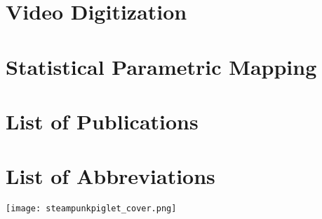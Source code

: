 \documentclass[12pt,a4paper,twoside]{report}
\newcommand\cleartorightpage{%
\clearpage
\hbox{}
}
\newcommand\chng[1]{{\color{darkgreen}#1}}
\newcommand{\setbackgroundcolour}{\pagecolor[rgb]{0.10,0.10,0.10}}
\newcommand{\settextcolour}{\color[rgb]{1.0,1.0,1.0}}
\newcommand{\invertbackgroundtext}{\setbackgroundcolour\settextcolour}
\begin{document}
\clearpage
\section{Video Digitization}\label{cpt:digitization}
%

\clearpage
\section{Statistical Parametric Mapping}\label{cpt:spm1d}
%

\clearpage
\section{\chng{List of Publications}}\label{cpt:publications}
%


\clearpage
\section{List of Abbreviations}\label{abbreviations}
\begin{spacing}{1.5}
%
\end{spacing}



\cleartorightpage\pagebreak
\makeatletter
\invertbackgroundtext
\vspace{\fill}
\texttt{[image: steampunkpiglet\_cover.png]}
\vspace{\fill}
\makeatother
\thispagestyle{empty}
\end{document}
